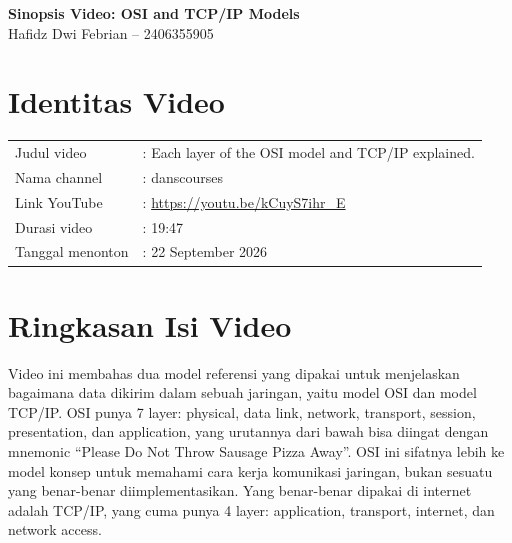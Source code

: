 \documentclass[11pt]{article}
\begin{document}
\begin{center}
{\LARGE \bfseries Sinopsis Video: OSI and TCP/IP Models} \\[4pt]
{\large Hafidz Dwi Febrian -- 2406355905}
\end{center}

\vspace{6pt}

\section*{Identitas Video}
\begin{tabular}{ll}
Judul video & : Each layer of the OSI model and TCP/IP explained. \\
Nama channel & : danscourses \\
Link YouTube & : \url{https://youtu.be/kCuyS7ihr_E} \\
Durasi video & : 19:47 \\
Tanggal menonton & : 22 September 2026 \\
\end{tabular}

\section*{Ringkasan Isi Video}

Video ini membahas dua model referensi yang dipakai untuk menjelaskan bagaimana data dikirim dalam sebuah jaringan, yaitu model OSI dan model TCP/IP. OSI punya 7 layer: physical, data link, network, transport, session, presentation, dan application, yang urutannya dari bawah bisa diingat dengan mnemonic ``Please Do Not Throw Sausage Pizza Away''. OSI ini sifatnya lebih ke model konsep untuk memahami cara kerja komunikasi jaringan, bukan sesuatu yang benar-benar diimplementasikan. Yang benar-benar dipakai di internet adalah TCP/IP, yang cuma punya 4 layer: application, transport, internet, dan network access.
\end{document}
